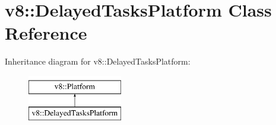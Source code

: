 \hypertarget{classv8_1_1DelayedTasksPlatform}{}\section{v8\+:\+:Delayed\+Tasks\+Platform Class Reference}
\label{classv8_1_1DelayedTasksPlatform}
Inheritance diagram for v8\+:\+:Delayed\+Tasks\+Platform\+:\begin{figure}[H]
\begin{center}
\leavevmode
\includegraphics[height=2.000000cm]{classv8_1_1DelayedTasksPlatform}
\end{center}
\end{figure}
